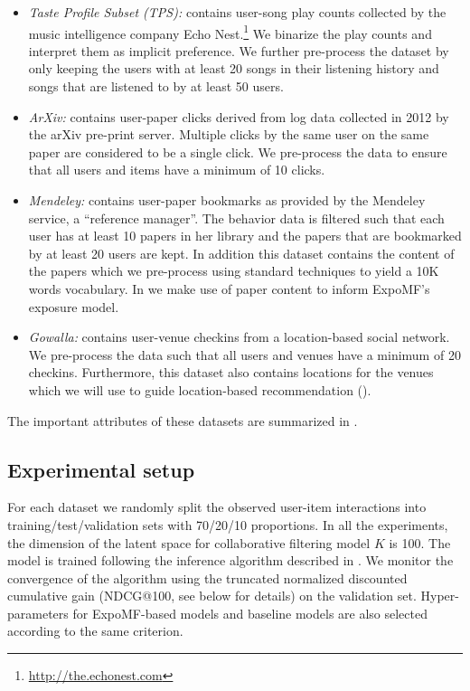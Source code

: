 \begin{itemize}
\item \emph{Taste Profile Subset (TPS):} contains user-song play counts
collected by the music intelligence company Echo
Nest.\footnote{\url{http://the.echonest.com}} We binarize the play counts and
interpret them as implicit preference. We further pre-process the dataset by
only keeping the users with at least 20 songs in their listening history and
songs that are listened to by at least 50 users. 

\item \emph{ArXiv:} contains user-paper clicks derived from log data collected
in 2012 by the arXiv pre-print server. Multiple clicks
by the same user on the same paper are considered to be a single click. We
pre-process the data to ensure that all users and items have a minimum of 10
clicks. 

\item \emph{Mendeley:} contains user-paper bookmarks as provided by 
the Mendeley service, a ``reference
manager''. The behavior data is filtered such that each
user has at least 10 papers in her library and the papers that are bookmarked
by at least 20 users are kept. In addition this dataset contains the
content of the papers which we pre-process using standard techniques to
yield a 10K words vocabulary. In  we make use of paper
content to inform ExpoMF's exposure model.  

\item \emph{Gowalla:} contains user-venue checkins from a location-based social
network. We pre-process the data such that all
users and venues have a minimum of 20 checkins. Furthermore, this dataset
also contains locations for the venues which we will use to guide 
location-based recommendation ().  
\end{itemize}

The important attributes of these datasets are summarized in .

\subsection{Experimental setup} 

For each dataset we randomly split the observed user-item interactions
into training/test/validation sets with 70/20/10 proportions. In all the experiments, the dimension 
of the latent space for collaborative filtering model $K$ is 100. The
model is trained following the inference algorithm described in
. We monitor the convergence of the algorithm using
the truncated normalized discounted cumulative gain ({NDCG@100}, see below for
details) on the validation set. Hyper-parameters for ExpoMF-based models
and baseline models are also selected according to the same criterion.


